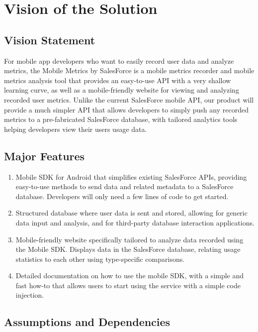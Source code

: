 \documentclass[12pt,oneside,letterpaper]{article}
\begin{document}
\section{Vision of the Solution}
\subsection{Vision Statement}
For mobile app developers who want to easily record user data and analyze metrics, the Mobile Metrics by SalesForce is a mobile metrics recorder and mobile metrics analysis tool that provides an easy-to-use API with a very shallow learning curve, as well as a mobile-friendly website for viewing and analyzing recorded user metrics. Unlike the current SalesForce mobile API, our product will provide a much simpler API that allows developers to simply push any recorded metrics to a pre-fabricated SalesForce database, with tailored analytics tools helping developers view their users usage data.

\subsection{Major Features}
\begin{enumerate}[label = {\textbf{MF-\arabic*}}, align = left, leftmargin = *, labelsep = 15pt]
\item Mobile SDK for Android that simplifies existing SalesForce APIs, providing easy-to-use methods to send data and related metadata to a SalesForce database. Developers will only need a few lines of code to get started.
\item Structured database where user data is sent and stored, allowing for generic data input and analysis, and for third-party database interaction applications.
\item Mobile-friendly website specifically tailored to analyze data recorded using the Mobile SDK. Displays data in the SalesForce database, relating usage statistics to each other using type-specific comparisons.
\item Detailed documentation on how to use the mobile SDK, with a simple and fast how-to that allows users to start using the service with a simple code injection.
\end{enumerate}

\subsection{Assumptions and Dependencies}
\end{document}
